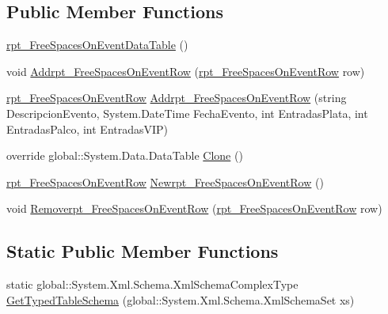 \subsection*{Public Member Functions}
\begin{DoxyCompactItemize}
\item 
\hyperlink{classprj_progra_i_i_i_1_1rpt___free_spaces_on_event_1_1rpt___free_spaces_on_event_data_table_aa803fe17d013c848d1954f2675af80ee}{rpt\+\_\+\+Free\+Spaces\+On\+Event\+Data\+Table} ()
\item 
void \hyperlink{classprj_progra_i_i_i_1_1rpt___free_spaces_on_event_1_1rpt___free_spaces_on_event_data_table_abfc88a3ab40ed8ba7bcc442ecc78532f}{Addrpt\+\_\+\+Free\+Spaces\+On\+Event\+Row} (\hyperlink{classprj_progra_i_i_i_1_1rpt___free_spaces_on_event_1_1rpt___free_spaces_on_event_row}{rpt\+\_\+\+Free\+Spaces\+On\+Event\+Row} row)
\item 
\hyperlink{classprj_progra_i_i_i_1_1rpt___free_spaces_on_event_1_1rpt___free_spaces_on_event_row}{rpt\+\_\+\+Free\+Spaces\+On\+Event\+Row} \hyperlink{classprj_progra_i_i_i_1_1rpt___free_spaces_on_event_1_1rpt___free_spaces_on_event_data_table_a543af7ceb615b9ab0346d5f08c40c1e8}{Addrpt\+\_\+\+Free\+Spaces\+On\+Event\+Row} (string Descripcion\+Evento, System.\+Date\+Time Fecha\+Evento, int Entradas\+Plata, int Entradas\+Palco, int Entradas\+V\+IP)
\item 
override global\+::\+System.\+Data.\+Data\+Table \hyperlink{classprj_progra_i_i_i_1_1rpt___free_spaces_on_event_1_1rpt___free_spaces_on_event_data_table_ad22261209728da11260b9ec279fdeb3b}{Clone} ()
\item 
\hyperlink{classprj_progra_i_i_i_1_1rpt___free_spaces_on_event_1_1rpt___free_spaces_on_event_row}{rpt\+\_\+\+Free\+Spaces\+On\+Event\+Row} \hyperlink{classprj_progra_i_i_i_1_1rpt___free_spaces_on_event_1_1rpt___free_spaces_on_event_data_table_adca49c665671f2fcebd8cf12bcce9624}{Newrpt\+\_\+\+Free\+Spaces\+On\+Event\+Row} ()
\item 
void \hyperlink{classprj_progra_i_i_i_1_1rpt___free_spaces_on_event_1_1rpt___free_spaces_on_event_data_table_a860a5f896ca863f2823c163a7848f611}{Removerpt\+\_\+\+Free\+Spaces\+On\+Event\+Row} (\hyperlink{classprj_progra_i_i_i_1_1rpt___free_spaces_on_event_1_1rpt___free_spaces_on_event_row}{rpt\+\_\+\+Free\+Spaces\+On\+Event\+Row} row)
\end{DoxyCompactItemize}
\subsection*{Static Public Member Functions}
\begin{DoxyCompactItemize}
\item 
static global\+::\+System.\+Xml.\+Schema.\+Xml\+Schema\+Complex\+Type \hyperlink{classprj_progra_i_i_i_1_1rpt___free_spaces_on_event_1_1rpt___free_spaces_on_event_data_table_aa7d42aa11130e480fcbdd9f7715a23f4}{Get\+Typed\+Table\+Schema} (global\+::\+System.\+Xml.\+Schema.\+Xml\+Schema\+Set xs)
\end{DoxyCompactItemize}
